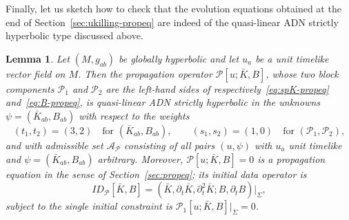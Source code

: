 \documentclass[a4paper]{article}
\newtheorem{lem}[thm]{Lemma}
\theoremstyle{remark}
\newcommand{\del}{\partial}
\begin{document}
Finally, let us sketch how to check that the evolution equations
obtained at the end of Section~\ref{sec:ukilling-propeq} are indeed of
the quasi-linear ADN strictly hyperbolic type discussed above.
\begin{lem} \label{lem:spKB-propeq-adn}
Let $(M,g_{ab})$ be globally hyperbolic and let $u_a$ be a unit timelike
vector field on $M$. Then the propagation operator
$\mathcal{P}[u;\bar{K},B]$, whose two block components $\mathcal{P}_1$
and $\mathcal{P}_2$ are the left-hand sides of
respectively~\eqref{eq:spK-propeq} and~\eqref{eq:B-propeq}, is
quasi-linear ADN strictly hyperbolic in the unknowns $\psi =
(\bar{K}_{ab}, B_{ab})$ with respect to the weights
\begin{equation} \label{eq:spKB-weights}
	(t_1,t_2) = (3,2) \quad \text{for } (\bar{K}_{ab}, B_{ab}) ,
	\qquad
	(s_1,s_2) = (1,0) \quad \text{for } (\mathcal{P}_1, \mathcal{P}_2) ,
\end{equation}
and with admissible set $\mathcal{A}_\mathcal{P}$ consisting of all
pairs $(u,\psi)$ with $u_a$ unit timelike and $\psi = (\bar{K}_{ab},
B_{ab})$ arbitrary. Moreover, $\mathcal{P}[u;\bar{K},B] = 0$ is a
propagation equation in the sense of Section~\ref{sec:propeq}; its
initial data operator is
\begin{equation} \label{eq:spKB-ID}
	ID_{\mathcal{P}}[\bar{K},B]
	= (\bar{K}, \del_t \bar{K}, \del_t^2 \bar{K}; B, \del_t B)|_\Sigma ,
\end{equation}
subject to the single initial constraint is $\mathcal{P}_1[u;\bar{K},
B]|_{\Sigma} = 0$.
\end{lem}
\end{document}
